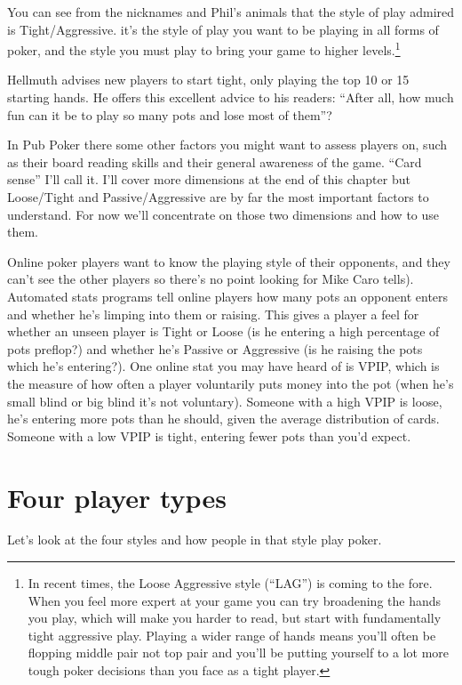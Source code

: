 You can see from the nicknames and Phil's animals that the style
of play admired is Tight/Aggressive. it's the style of play you want
to be playing in all forms of poker, and the style you must play to
bring your game to higher
levels.\footnote{In recent times, the Loose Aggressive style
(``LAG'') is coming to the fore. When you feel more expert
at your game you can try broadening the hands you play, which
will make you harder to read, but start with fundamentally
tight aggressive play. Playing a wider range of hands means you'll
often be flopping middle pair not top pair and you'll be putting
yourself to a lot more tough poker decisions than you face as a tight
player.}

Hellmuth advises new players to start tight, only playing the
top 10 or 15 starting hands. He offers this excellent
advice to his readers: ``After all, how much fun can it be to
play so many pots and lose most of them''?

In Pub Poker there some other factors you might want to assess
players on, such as their board reading skills and their general
awareness of the game. ``Card sense'' I'll call it.  I'll cover more
dimensions at the end of this chapter but Loose/Tight and
Passive/Aggressive are by far the most important factors to
understand. For now we'll concentrate on those
two dimensions and how to use them.

Online poker players want to know the playing style of their
opponents, and they can't see the other players so there's no point
looking for Mike Caro tells). Automated stats programs tell online
players how many pots an opponent enters and whether he's limping into
them or raising. This gives a player a feel for whether an unseen
player is Tight or Loose (is he entering a high percentage of pots
preflop?) and whether he's Passive or Aggressive (is he raising the
pots which he's entering?). One online stat you may have heard of is
VPIP, which is the measure of how often a player voluntarily puts
money into the pot (when he's small blind or big blind it's not
voluntary). Someone with a high VPIP is loose, he's entering more pots
than he should, given the average distribution of cards. Someone with
a low VPIP is tight, entering fewer pots than you'd expect.

\section{Four player types}

Let's look at the four styles and how people in that style play poker.

